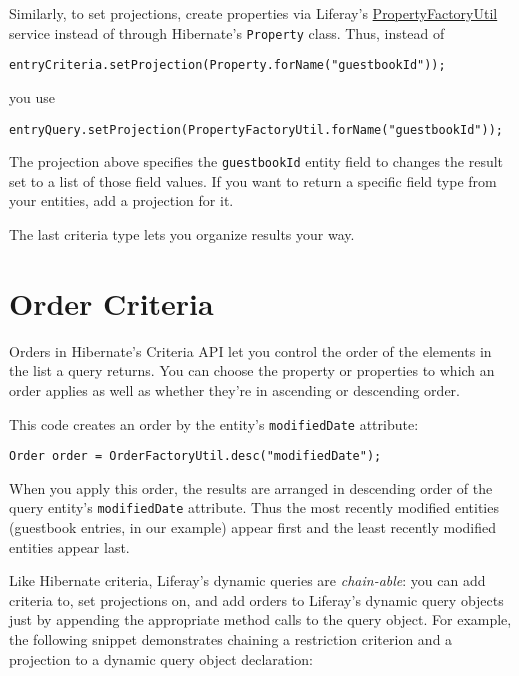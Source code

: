 Similarly, to set projections, create properties via Liferay's
\href{https://docs.liferay.com/dxp/portal/7.0-latest/javadocs/portal-kernel/com/liferay/portal/kernel/dao/orm/PropertyFactoryUtil.html}{PropertyFactoryUtil}
service instead of through Hibernate's \texttt{Property} class. Thus,
instead of

\begin{verbatim}
entryCriteria.setProjection(Property.forName("guestbookId"));
\end{verbatim}

you use

\begin{verbatim}
entryQuery.setProjection(PropertyFactoryUtil.forName("guestbookId"));
\end{verbatim}

The projection above specifies the \texttt{guestbookId} entity field to
changes the result set to a list of those field values. If you want to
return a specific field type from your entities, add a projection for
it.

The last criteria type lets you organize results your way.

\section{Order Criteria}\label{order-criteria}

Orders in Hibernate's Criteria API let you control the order of the
elements in the list a query returns. You can choose the property or
properties to which an order applies as well as whether they're in
ascending or descending order.

This code creates an order by the entity's \texttt{modifiedDate}
attribute:

\begin{verbatim}
Order order = OrderFactoryUtil.desc("modifiedDate");
\end{verbatim}

When you apply this order, the results are arranged in descending order
of the query entity's \texttt{modifiedDate} attribute. Thus the most
recently modified entities (guestbook entries, in our example) appear
first and the least recently modified entities appear last.

Like Hibernate criteria, Liferay's dynamic queries are
\emph{chain-able}: you can add criteria to, set projections on, and add
orders to Liferay's dynamic query objects just by appending the
appropriate method calls to the query object. For example, the following
snippet demonstrates chaining a restriction criterion and a projection
to a dynamic query object declaration:

